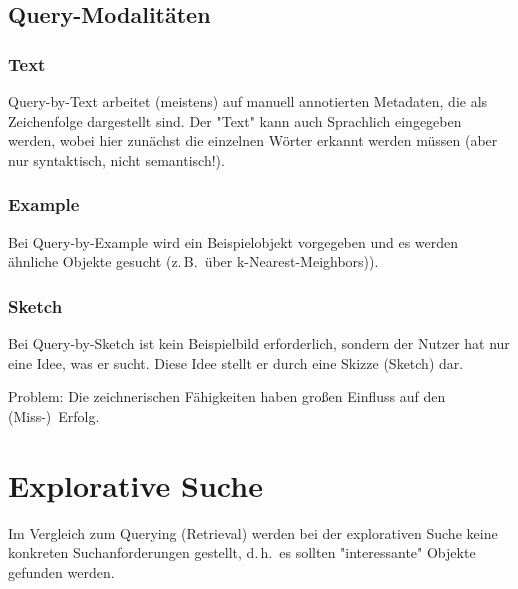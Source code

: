 \documentclass[a4paper, 11pt, accentcolor = tud3b]{tudreport}
\renewcommand{\dh}{d.\,h.~}
\newcommand{\zB}{z.\,B.~}
\begin{document}
			\subsection{Query-Modalitäten}
				\subsubsection{Text} 
					Query-by-Text arbeitet (meistens) auf manuell annotierten Metadaten, die als Zeichenfolge dargestellt sind. Der "Text" kann auch Sprachlich eingegeben werden, wobei hier zunächst die einzelnen Wörter erkannt werden müssen (aber nur syntaktisch, nicht semantisch!).
	
				\subsubsection{Example}
					Bei Query-by-Example wird ein Beispielobjekt vorgegeben und es werden ähnliche Objekte gesucht (\zB über k-Nearest-Meighbors)).
	
				\subsubsection{Sketch}
					Bei Query-by-Sketch ist kein Beispielbild erforderlich, sondern der Nutzer hat nur eine Idee, was er sucht. Diese Idee stellt er durch eine Skizze (Sketch) dar.
					
					Problem: Die zeichnerischen Fähigkeiten haben großen Einfluss auf den (Miss-)~Erfolg.

		\section{Explorative Suche}
			Im Vergleich zum Querying (Retrieval) werden bei der explorativen Suche keine konkreten Suchanforderungen gestellt, \dh es sollten "interessante" Objekte gefunden werden.
\end{document}

